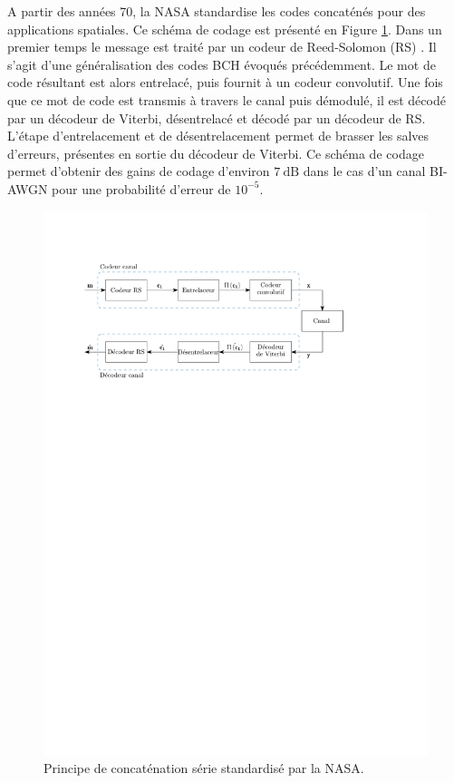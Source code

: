 A partir des années 70, la NASA standardise les codes concaténés pour des applications spatiales. Ce schéma de codage 
est présenté en Figure \ref{fig:nasa}. Dans un premier temps le message est traité par un codeur de Reed-Solomon (RS) \cite{RS}. 
Il s'agit d'une généralisation des codes BCH évoqués précédemment. Le mot de code résultant est alors entrelacé, puis fournit à un 
codeur convolutif. Une fois que ce mot de code est transmis à travers le canal puis démodulé, il est décodé par un 
décodeur de Viterbi, désentrelacé et décodé par un décodeur de RS. L'étape d'entrelacement et de désentrelacement 
permet de brasser les salves d'erreurs, présentes en sortie du décodeur de Viterbi. Ce schéma de codage permet d'obtenir 
des gains de codage d'environ $7~\text{dB}$ dans le cas d'un canal BI-AWGN pour une probabilité d'erreur de $10^{-5}$.
\begin{figure}[!h]
	\centering
	\includegraphics[width=12cm]{main/ch1_fig/nasa.pdf}
	\caption{\label{fig:nasa} Principe de concaténation série standardisé par la NASA.}
\end{figure}

